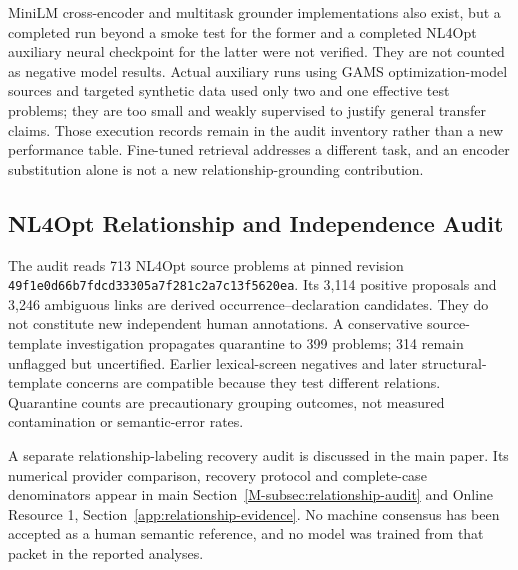 MiniLM cross-encoder and multitask grounder implementations also exist, but a completed run beyond a smoke test for the former and a completed NL4Opt auxiliary neural checkpoint for the latter were not verified. They are not counted as negative model results. Actual auxiliary runs using GAMS optimization-model sources and targeted synthetic data used only two and one effective test problems; they are too small and weakly supervised to justify general transfer claims. Those execution records remain in the audit inventory rather than a new performance table. Fine-tuned retrieval addresses a different task, and an encoder substitution alone is not a new relationship-grounding contribution.

\subsection{NL4Opt Relationship and Independence Audit}
\label{app:nl4opt-audit}

The audit reads 713 NL4Opt source problems at pinned revision \texttt{49f1e0d66b7fdcd33305a7f281c2a7c13f5620ea}. Its 3,114 positive proposals and 3,246 ambiguous links are derived occurrence--declaration candidates. They do not constitute new independent human annotations. A conservative source-template investigation propagates quarantine to 399 problems; 314 remain unflagged but uncertified. Earlier lexical-screen negatives and later structural-template concerns are compatible because they test different relations. Quarantine counts are precautionary grouping outcomes, not measured contamination or semantic-error rates.

A separate relationship-labeling recovery audit is discussed in the main paper. Its numerical provider comparison, recovery protocol and complete-case denominators appear in main Section~\ref{M-subsec:relationship-audit} and Online Resource 1, Section~\ref{app:relationship-evidence}. No machine consensus has been accepted as a human semantic reference, and no model was trained from that packet in the reported analyses.
